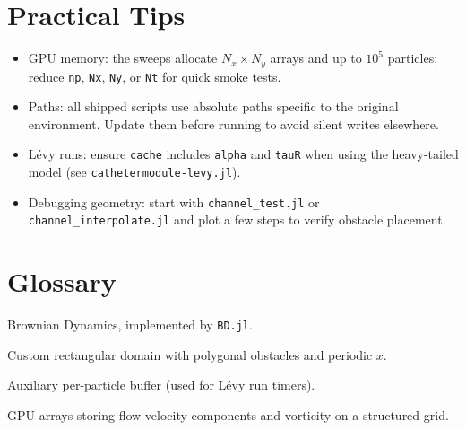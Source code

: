 \documentclass[11pt]{article}
\begin{document}
\section{Practical Tips}
\begin{itemize}[leftmargin=*]
  \item GPU memory: the sweeps allocate $N_x\times N_y$ arrays and up to $10^5$ particles; reduce \texttt{np}, \texttt{Nx}, \texttt{Ny}, or \texttt{Nt} for quick smoke tests.
  \item Paths: all shipped scripts use absolute paths specific to the original environment. Update them before running to avoid silent writes elsewhere.
  \item L\'evy runs: ensure \texttt{cache} includes \texttt{alpha} and \texttt{tauR} when using the heavy-tailed model (see \texttt{cathetermodule-levy.jl}).
  \item Debugging geometry: start with \texttt{channel\_test.jl} or \texttt{channel\_interpolate.jl} and plot a few steps to verify obstacle placement.
\end{itemize}

\section{Glossary}
\begin{description}[leftmargin=!,labelwidth=3cm]
  \item[BD] Brownian Dynamics, implemented by \texttt{BD.jl}.
  \item[Irregular] Custom rectangular domain with polygonal obstacles and periodic $x$.
  \item[ParticleData.data] Auxiliary per-particle buffer (used for L\'evy run timers).
  \item[Ux, Uy, Omega] GPU arrays storing flow velocity components and vorticity on a structured grid.
\end{description}
\end{document}
